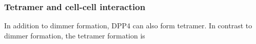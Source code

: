 \subsubsection{Tetramer and cell-cell interaction}

In addition to dimmer formation, DPP4 can also form tetramer. In contrast to dimmer formation, the tetramer formation is 